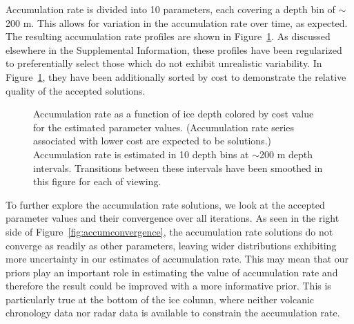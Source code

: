 Accumulation rate is divided into 10 parameters, each covering a depth bin of $\sim$200 m. This allows for variation in the accumulation rate over time, as expected. The resulting accumulation rate profiles are shown in Figure~\ref{fig:accumdepth}. As discussed elsewhere in the Supplemental Information, these profiles have been regularized to preferentially select those which do not exhibit unrealistic variability. In Figure~\ref{fig:accumdepth}, they have been additionally sorted by cost to demonstrate the relative quality of the accepted solutions.

\begin{figure}[ht]
\centering
{}
\caption[]{Accumulation rate as a function of ice depth colored by cost value for the estimated parameter values. (Accumulation rate series associated with lower cost are expected to be solutions.) Accumulation rate is estimated in 10 depth bins at $\sim$200 m depth intervals. Transitions between these intervals have been smoothed in this figure for each of viewing.}
\label{fig:accumdepth}
\end{figure}

To further explore the accumulation rate solutions, we look at the accepted parameter values and their convergence over all iterations. As seen in the right side of Figure~\ref{fig:accumconvergence}, the accumulation rate solutions do not converge as readily as other parameters, leaving wider distributions exhibiting more uncertainty in our estimates of accumulation rate. This may mean that our priors play an important role in estimating the value of accumulation rate and therefore the result could be improved with a more informative prior. This is particularly true at the bottom of the ice column, where neither volcanic chronology data nor radar data is available to constrain the accumulation rate.

